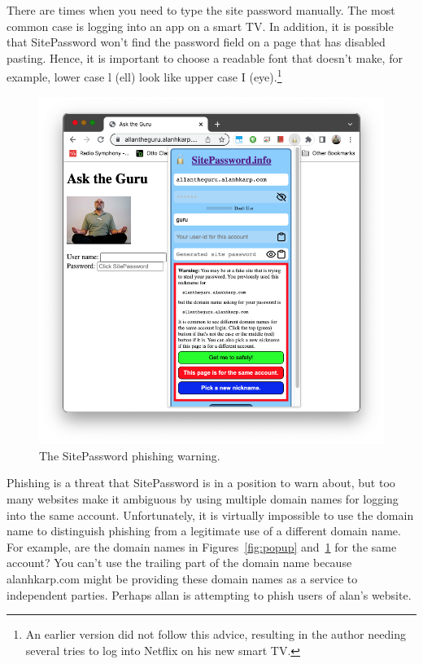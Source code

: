 There are times when you need to type the site password manually.  The most common case is logging into an app on a smart TV.  In addition, it is possible that SitePassword won't find the password field on a page that has disabled pasting.  Hence, it is important to choose a readable font that doesn't make, for example, lower case l (ell) look like upper case I (eye).\footnote{An earlier version did not follow this advice, resulting in the author needing several tries to log into Netflix on his new smart TV.} 
 
\begin{figure}
\begin{center}
  \includegraphics[scale=0.30]{soupsfig3.png}
\end{center}
\caption{\label{fig:phishing} The SitePassword phishing warning. }
\end{figure}

Phishing is a threat that SitePassword is in a position to warn about, but too many websites make it ambiguous by using multiple domain names for logging into the same account.  Unfortunately, it is virtually impossible to use the domain name to distinguish phishing from a legitimate use of a different domain name.  For example, are the domain names in Figures~\ref{fig:popup} and~\ref{fig:phishing} for the same account?  You can't use the trailing part of the domain name because alanhkarp.com might be providing these domain names as a service to independent parties.  Perhaps allan is attempting to phish users of alan's website.

